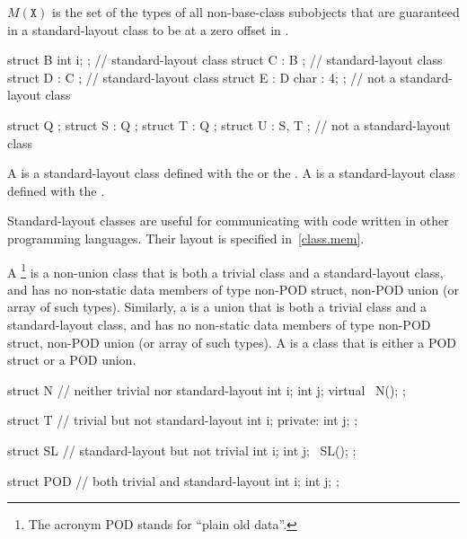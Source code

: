 \begin{note} $M(\mathtt{X})$ is the set of the types of all non-base-class subobjects
that are guaranteed in a standard-layout class to be at a zero offset
in . \end{note}

\begin{example}
\begin{codeblock}
   struct B { int i; };         // standard-layout class
   struct C : B { };            // standard-layout class
   struct D : C { };            // standard-layout class
   struct E : D { char : 4; };  // not a standard-layout class

   struct Q {};
   struct S : Q { };
   struct T : Q { };
   struct U : S, T { };         // not a standard-layout class
\end{codeblock}
\end{example}

%
%
%
%
\pnum
A  is a standard-layout class
defined with the   or the
 .
A  is a standard-layout class
defined with the
 .

\pnum
\begin{note} Standard-layout classes are useful for communicating with
code written in other programming languages. Their layout is specified
in~\ref{class.mem}.\end{note}

\pnum
{}%
A \footnote{The acronym POD stands for ``plain old data''.}
is a non-union class that is both a trivial class and a
standard-layout class, and has no non-static data members of type non-POD struct,
non-POD union (or array of such types). Similarly, a
 is a union that is both a trivial class and a standard-layout
class, and has no non-static data members of type non-POD struct, non-POD
union (or array of such types). A  is a
class that is either a POD struct or a POD union.

\begin{example}
\begin{codeblock}
struct N {          // neither trivial nor standard-layout
  int i;
  int j;
  virtual ~N();
};

struct T {          // trivial but not standard-layout
  int i;
private: 
  int j;
};

struct SL {         // standard-layout but not trivial
  int i;
  int j;
  ~SL();
};

struct POD {        // both trivial and standard-layout
  int i;
  int j;
};
\end{codeblock}
\end{example}

